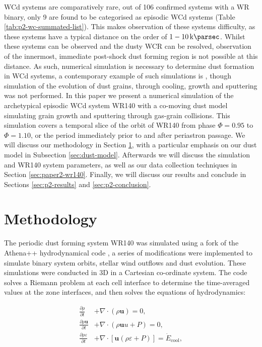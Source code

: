 \documentclass[fleqn,usenatbib]{mnras}
\begin{document}
WCd systems are comparatively rare, out of 106 confirmed systems with a WR binary, only 9 are found to be categorised as episodic WCd systems
(Table \ref{tab:p2-wc-summated-list}).
This makes observation of these systems difficulty, as these systems have a typical distance on the order of $1-10 \, \si{\kilo\parsec}$.
Whilst these systems can be observed and the dusty WCR can be resolved, observation of the innermost, immediate post-shock dust forming region is not possible at this distance.
As such, numerical simulation is necessary to determine dust formation in WCd systems, a contemporary example of such simulations is \cite{hendrix_pinwheels_2016}, though simulation of the evolution of dust grains, through cooling, growth and sputtering was not performed.
In this paper we present a numerical simulation of the archetypical episodic WCd system WR140 with a co-moving dust model simulating grain growth and sputtering through gas-grain collisions.
This simulation covers a temporal slice of the orbit of WR140 from phase $\Phi = 0.95$ to $\Phi = 1.10$, or the period immediately prior to and after periastron passage.
We will discuss our methodology in Section \ref{sec:paper-2-methodology}, with a particular emphasis on our dust model in Subsection \ref{sec:dust-model}.
Afterwards we will discuss the simulation and WR140 system parameters, as well as our data collection techniques in Section \ref{sec:paper2-wr140}.
Finally, we will discuss our results and conclude in Sections \ref{sec:p2-results} and \ref{sec:p2-conclusion}.

\section{Methodology}
\label{sec:paper-2-methodology}

The periodic dust forming system WR140 was simulated using a fork of the Athena++ hydrodynamical code \citep{stoneAthenaAdaptiveMesh2020}, a series of modifications were implemented to simulate binary system orbits, stellar wind outflows and dust evolution.
These simulations were conducted in 3D in a Cartesian co-ordinate system.
The code solves a Riemann problem at each cell interface to determine the time-averaged values at the zone interfaces, and then solves the equations of hydrodynamics:

\begin{subequations}
  \begin{align}
    \frac{\partial\rho}{\partial t} & +\nabla \cdot \left(\rho \boldsymbol{u}\right) = 0 , \\
    \frac{\partial \rho \boldsymbol{u}}{\partial t} & + \nabla \cdot \left(\rho \boldsymbol{u} u + P \right) = 0, \\
    \frac{\partial \rho \varepsilon}{\partial t} & + \nabla \cdot \left[ \boldsymbol{u} \left( \rho\varepsilon + P \right) \right] = \dot E_\text{cool} , 
  \end{align}
\end{subequations}
\end{document}
